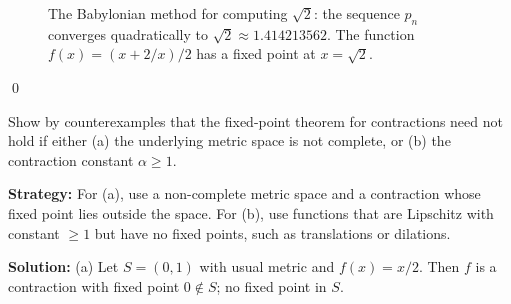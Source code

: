 \begin{figure}[h]
\centering
{}
\caption{The Babylonian method for computing $\sqrt{2}$: the sequence $p_n$ converges quadratically to $\sqrt{2} \approx 1.414213562$. The function $f(x) = (x + 2/x)/2$ has a fixed point at $x = \sqrt{2}$.}
\end{figure}\qed



\begin{problembox}
\begin{problemstatement}
Show by counterexamples that the fixed-point theorem for contractions need not hold if either (a) the underlying metric space is not complete, or (b) the contraction constant $\alpha \ge 1$.
\end{problemstatement}
\end{problembox}

\noindent\textbf{Strategy:} For (a), use a non-complete metric space and a contraction whose fixed point lies outside the space. For (b), use functions that are Lipschitz with constant $\geq 1$ but have no fixed points, such as translations or dilations.

\bigskip\noindent\textbf{Solution:}
(a) Let $S=(0,1)$ with usual metric and $f(x)=x/2$. Then $f$ is a contraction with fixed point $0\notin S$; no fixed point in $S$.

